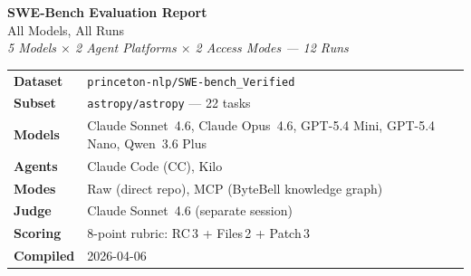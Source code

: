 \documentclass[11pt, a4paper]{article}
\begin{document}
\begin{titlepage}
\centering
\vspace*{2cm}

{\Huge\bfseries SWE-Bench Evaluation Report}\\[0.6em]
{\LARGE All Models, All Runs}\\[2em]

{\large\itshape 5 Models $\times$ 2 Agent Platforms $\times$ 2 Access Modes --- 12 Runs}\\[3em]

\begin{tabular}{ll}
\textbf{Dataset}   & \texttt{princeton-nlp/SWE-bench\_Verified} \\[0.3em]
\textbf{Subset}    & \texttt{astropy/astropy} --- 22 tasks \\[0.3em]
\textbf{Models}    & Claude Sonnet~4.6, Claude Opus~4.6, GPT-5.4 Mini, GPT-5.4 Nano, Qwen~3.6 Plus \\[0.3em]
\textbf{Agents}    & Claude Code (CC), Kilo \\[0.3em]
\textbf{Modes}     & Raw (direct repo), MCP (ByteBell knowledge graph) \\[0.3em]
\textbf{Judge}     & Claude Sonnet~4.6 (separate session) \\[0.3em]
\textbf{Scoring}   & 8-point rubric: RC\,3 + Files\,2 + Patch\,3 \\[0.3em]
\textbf{Compiled}  & 2026-04-06 \\
\end{tabular}

\vfill


\end{titlepage}
\end{document}
